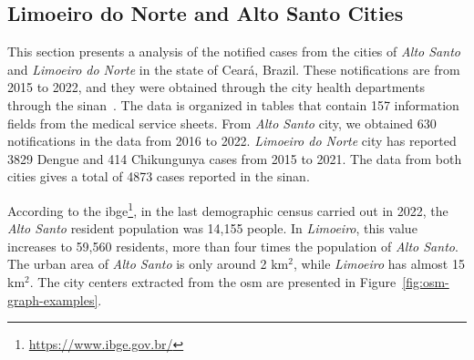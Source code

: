 \subsection{Limoeiro do Norte and Alto Santo Cities}\label{subsec:limoeiro-do-norte-and-alto-santo-cities}

This section presents a analysis of the notified cases from the cities of
\textit{Alto Santo} and \textit{Limoeiro do Norte} in the state of Ceará,
Brazil. These notifications are from 2015 to 2022, and they were obtained
through the city health departments through the
\gls{sinan}~\cite{laguardia:2004}. The data is organized in tables that contain
157 information fields from the medical service sheets. From \textit{Alto Santo}
city, we obtained 630 notifications in the data from 2016 to 2022.
\textit{Limoeiro do Norte} city has reported 3829 Dengue and 414 Chikungunya
cases from 2015 to 2021. The data from both cities gives a total of 4873 cases
reported in the \gls{sinan}.

According to the \gls{ibge}\footnote{\url{https://www.ibge.gov.br/}}, in the
last demographic census carried out in 2022, the \textit{Alto Santo} resident
population was 14,155 people. In \textit{Limoeiro}, this value increases to
59,560 residents, more than four times the population of \textit{Alto Santo}.
The urban area of \textit{Alto Santo} is only around 2 km$^2$, while
\textit{Limoeiro} has almost 15 km$^2$. The city centers extracted from the
\gls{osm} are presented in Figure~\ref{fig:osm-graph-examples}.

